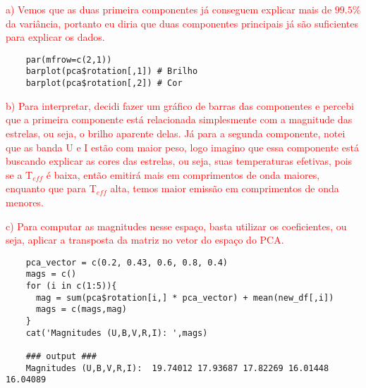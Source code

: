 \textcolor{red}{a) Vemos que as duas primeira componentes já conseguem explicar mais de $99.5\%$ da variância, portanto eu diria que duas componentes principais já são suficientes para explicar os dados.}


\begin{lstlisting}
    par(mfrow=c(2,1))
    barplot(pca$rotation[,1]) # Brilho
    barplot(pca$rotation[,2]) # Cor
\end{lstlisting}

\textcolor{red}{b) Para interpretar, decidi fazer um gráfico de barras das componentes e percebi que a primeira componente está relacionada simplesmente com a magnitude das estrelas, ou seja, o brilho aparente delas. Já para a segunda componente, notei que as banda U e I estão com maior peso, logo imagino que essa componente está buscando explicar as cores das estrelas, ou seja, suas temperaturas efetivas, pois se a T$_{eff}$ é baixa, então emitirá mais em comprimentos de onda maiores, enquanto que para T$_{eff}$ alta, temos maior emissão em comprimentos de onda menores.}


\textcolor{red}{c) Para computar as magnitudes nesse espaço, basta utilizar os coeficientes, ou seja, aplicar a transposta da matriz no vetor do espaço do PCA.}

\begin{lstlisting}
    pca_vector = c(0.2, 0.43, 0.6, 0.8, 0.4)
    mags = c()
    for (i in c(1:5)){
      mag = sum(pca$rotation[i,] * pca_vector) + mean(new_df[,i])
      mags = c(mags,mag)
    }
    cat('Magnitudes (U,B,V,R,I): ',mags)

    ### output ###
    Magnitudes (U,B,V,R,I):  19.74012 17.93687 17.82269 16.01448 16.04089
\end{lstlisting}

